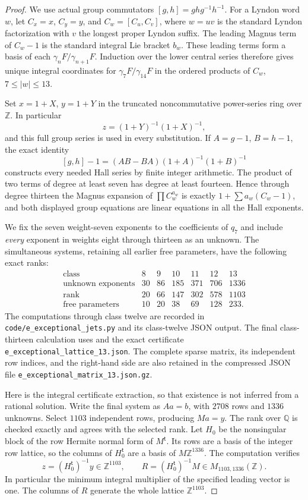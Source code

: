 \begin{proof}
We use actual group commutators $[g,h]=ghg^{-1}h^{-1}$.
For a Lyndon word $w$, let $C_x=x$, $C_y=y$, and
$C_w=[C_u,C_v]$, where $w=uv$ is the standard Lyndon
factorization with $v$ the longest proper Lyndon suffix.
The leading Magnus term of $C_w-1$ is the standard integral
Lie bracket $b_w$. These leading terms form a basis of each
$\gamma_nF/\gamma_{n+1}F$. Induction over the lower central
series therefore gives unique integral coordinates for
$\gamma_7F/\gamma_{14}F$ in the ordered products of
$C_w$, $7\leq |w|\leq13$.

Set $x=1+X$, $y=1+Y$ in the truncated noncommutative
power-series ring over $\mathbb Z$. In particular
\[
 z=(1+Y)^{-1}(1+X)^{-1},
\]
and this full group series is used in every substitution.
If $A=g-1$, $B=h-1$, the exact identity
\[
 [g,h]-1=(AB-BA)(1+A)^{-1}(1+B)^{-1}
\]
constructs every needed Hall series by finite integer arithmetic.
The product of two terms of degree at least seven has degree at
least fourteen. Hence through degree thirteen the Magnus expansion
of $\prod C_w^{a_w}$ is exactly
$1+\sum a_w(C_w-1)$, and both displayed group equations
are linear equations in all the Hall exponents.

We fix the seven weight-seven exponents to the coefficients of
$q_7$ and include \emph{every} exponent in weights eight through
thirteen as an unknown. The simultaneous systems, retaining all
earlier free parameters, have the following exact ranks:
\[
\begin{array}{c|rrrrrr}
\text{class}&8&9&10&11&12&13\\\hline
\text{unknown exponents}&30&86&185&371&706&1336\\
\text{rank}&20&66&147&302&578&1103\\
\text{free parameters}&10&20&38&69&128&233.
\end{array}
\]
The computations through class twelve are recorded in
\texttt{code/e\_exceptional\_jets.py} and its class-twelve JSON
output. The final class-thirteen calculation uses
 and the exact certificate
\texttt{e\_exceptional\_lattice\_13.json}.
The complete sparse matrix, its independent row indices, and the
right-hand side are also retained in the compressed JSON file
\texttt{e\_exceptional\_matrix\_13.json.gz}.

Here is the integral certificate extraction, so that existence
is not inferred from a rational solution. Write the final system
as $Aa=b$, with $2708$ rows and $1336$ unknowns. Select $1103$
independent rows, producing $Ma=y$. The rank over $\mathbb Q$
is checked exactly and agrees with the selected rank. Let $H_0$
be the nonsingular block of the row Hermite normal form of
$M^{\mathsf t}$. Its rows are a basis of the integer row lattice,
so the columns of $H_0^{\mathsf t}$ are a basis of
$M\mathbb Z^{1336}$. The computation verifies
\[
 z=(H_0^{\mathsf t})^{-1}y\in\mathbb Z^{1103},
 \qquad
 R=(H_0^{\mathsf t})^{-1}M
       \in M_{1103,1336}(\mathbb Z).
\]
In particular the minimum integral multiplier of the specified
leading vector is one. The columns of $R$ generate the whole
lattice $\mathbb Z^{1103}$.


\end{proof}
